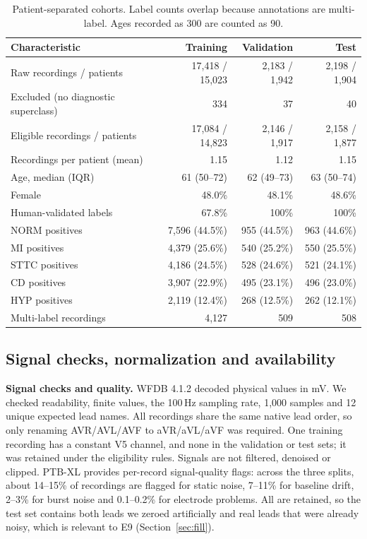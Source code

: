 \begin{table}[htbp]
\centering\small
\caption{Patient-separated cohorts. Label counts overlap because annotations are multi-label. Ages recorded as 300 are counted as 90.}
\label{tab:cohort}
\begin{tabular}{lrrr}
\toprule
Characteristic & Training & Validation & Test \\
\midrule
Raw recordings / patients & 17,418 / 15,023 & 2,183 / 1,942 & 2,198 / 1,904 \\
Excluded (no diagnostic superclass) & 334 & 37 & 40 \\
Eligible recordings / patients & 17,084 / 14,823 & 2,146 / 1,917 & 2,158 / 1,877 \\
Recordings per patient (mean) & 1.15 & 1.12 & 1.15 \\
Age, median (IQR) & 61 (50--72) & 62 (49--73) & 63 (50--74) \\
Female & 48.0\% & 48.1\% & 48.6\% \\
Human-validated labels & 67.8\% & 100\% & 100\% \\
NORM positives & 7,596 (44.5\%) & 955 (44.5\%) & 963 (44.6\%) \\
MI positives & 4,379 (25.6\%) & 540 (25.2\%) & 550 (25.5\%) \\
STTC positives & 4,186 (24.5\%) & 528 (24.6\%) & 521 (24.1\%) \\
CD positives & 3,907 (22.9\%) & 495 (23.1\%) & 496 (23.0\%) \\
HYP positives & 2,119 (12.4\%) & 268 (12.5\%) & 262 (12.1\%) \\
Multi-label recordings & 4,127 & 509 & 508 \\
\bottomrule
\end{tabular}
\end{table}

\subsection{Signal checks, normalization and availability}

\textbf{Signal checks and quality.} WFDB 4.1.2 decoded physical values in mV. We checked readability, finite values, the 100\,Hz sampling rate, 1,000 samples and 12 unique expected lead names. All recordings share the same native lead order, so only renaming AVR/AVL/AVF to aVR/aVL/aVF was required. One training recording has a constant V5 channel, and none in the validation or test sets; it was retained under the eligibility rules. Signals are not filtered, denoised or clipped. PTB-XL provides per-record signal-quality flags: across the three splits, about 14--15\% of recordings are flagged for static noise, 7--11\% for baseline drift, 2--3\% for burst noise and 0.1--0.2\% for electrode problems. All are retained, so the test set contains both leads we zeroed artificially and real leads that were already noisy, which is relevant to E9 (Section~\ref{sec:fill}).

